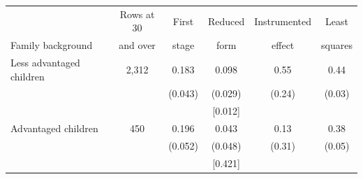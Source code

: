 \begin{tabular}{@{}lccccc@{}}
\toprule
 & Rows at 30 & First & Reduced & Instrumented & Least \\
Family background & and over & stage & form & effect & squares \\
\midrule
Less advantaged children & 2,312 & 0.183 & 0.098 & 0.55 & 0.44 \\
 & & (0.043) & (0.029) & (0.24) & (0.03) \\
 & & & [0.012] & & \\
Advantaged children & 450 & 0.196 & 0.043 & 0.13 & 0.38 \\
 & & (0.052) & (0.048) & (0.31) & (0.05) \\
 & & & [0.421] & & \\
\bottomrule
\end{tabular}
